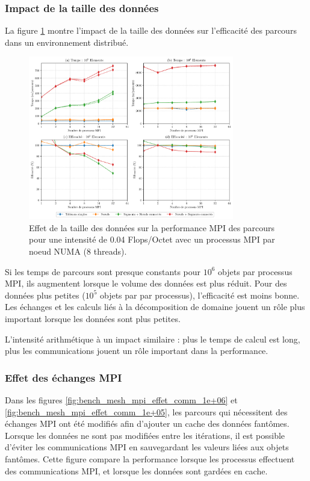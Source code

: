 \subsubsection{Impact de la taille des données}


La figure \ref{fig:bench_mesh_mpi_effet_taille} montre l'impact de la taille des données sur l'efficacité des parcours dans un environnement distribué.

\begin{figure}
	\centering
	\includegraphics[width=0.8\textwidth]{img/bench_mesh_mpi_effet_taille}
	\caption{Effet de la taille des données sur la performance MPI des parcours pour une intensité de 0.04 Flops/Octet avec un processus MPI par noeud NUMA (8 threads).}
	\label{fig:bench_mesh_mpi_effet_taille}
\end{figure}

Si les temps de parcours sont presque constants pour $10^6$ objets par processus MPI, ils augmentent lorsque le volume des données est plus réduit. Pour des données plus petites ($10^5$ objets par par processus), l'efficacité est moins bonne. Les échanges et les calculs liés à la décomposition de domaine jouent un rôle plus important lorsque les données sont plus petites.

L'intensité arithmétique à un impact similaire : plus le temps de calcul est long, plus les communications jouent un rôle important dans la performance.

\subsubsection{Effet des échanges MPI}

Dans les figures \ref{fig:bench_mesh_mpi_effet_comm_1e+06} et \ref{fig:bench_mesh_mpi_effet_comm_1e+05}, les parcours qui nécessitent des échanges MPI ont été modifiés afin d'ajouter un cache des données fantômes. Lorsque les données ne sont pas modifiées entre les itérations, il est possible d'éviter les communications MPI en sauvegardant les valeurs liées aux objets fantômes. Cette figure compare la performance lorsque les processus effectuent des communications MPI, et lorsque les données sont gardées en cache.

